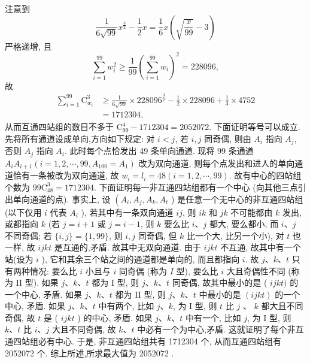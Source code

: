 注意到
$$
\frac{1}{6 \sqrt{99}} x^{\frac{3}{2}}-\frac{1}{2} x=\frac{1}{6} x\left(\sqrt{\frac{x}{99}}-3\right)
$$
严格递增, 且
$$
\sum_{i=1}^{99} w_i^2 \geqslant \frac{1}{99}\left(\sum_{i=1}^{99} w_i\right)^2=228096,
$$
故
$$
\begin{aligned}
\sum_{i=1}^{99} \mathrm{C}_{w_i}^3 & \geqslant \frac{1}{6 \sqrt{99}} \times 228096^{\frac{3}{2}}-\frac{1}{2} \times 228096+\frac{1}{3} \times 4752 \\
& =1712304,
\end{aligned}
$$
从而互通四站组的数目不多于 $\mathrm{C}_{99}^4-1712304=2052072$.
下面证明等号可以成立.
先将所有通道设成单向,方向如下规定: 对 $i< j$, 若 $i, j$ 同奇偶, 则由 $A_i$ 指向 $A_j$, 否则 $A_j$ 指向 $A_i$. 此时每个点恰发出 49 条单向通道.
现将 99 条通道 $A_i A_{i+1}\left(i=1,2, \cdots, 99, A_{100}=A_1\right)$ 改为双向通道, 则每个点发出和进人的单向通道恰有一条被改为双向通道, 故 $w_i=l_i=48(i= 1,2, \cdots, 99)$. 故有中心的四站组个数为 $99 \mathrm{C}_{48}^3=1712304$.
下面证明每一非互通四站组都有一个中心 (向其他三点引出单向通道的点). 事实上, 设 $\left(A_i, A_j, A_k, A_t\right.$ ) 是任意一个无中心的非互通四站组 (以下仅用 $i$ 代表 $A_i$ ), 若其中有一条双向通道 $i j$, 则 $i k$ 和 $j k$ 不可能都由 $k$ 发出, 或都指向 $k$ (若 $j=i+1$ 或 $j=i-1$, 则 $k$ 要么比 $i 、 j$ 都大, 要么都小, 而 $i 、 j$ 不同奇偶; 若 $\{i, j\}=\{1,99\}$, 则 $i, j$ 同奇偶, 但 $k$ 比一个大, 比另一个小), 对 $t$
也一样, 故 $i j k t$ 是互通的,矛盾.
故其中无双向通道.
由于 $i j k t$ 不互通, 故其中有一个站(设为 $i$ ), 它和其余三个站之间的通道都是单向的, 而且都指向 $i$. 故 $j 、 k 、 t$ 只有两种情况: 要么比 $i$ 小且与 $i$ 同奇偶 (称为 $I$ 型), 要么比 $i$ 大且奇偶性不同 (称为 II 型). 如果 $j 、 k 、 t$ 都为 I 型, 则 $j 、 k 、 t$ 同奇偶, 故其中最小的是 ( $i j k t)$ 的一个中心, 矛盾.
如果 $j 、 k 、 t$ 都为 II 型, 则 $j 、 k 、 t$ 中最小的是 $(i j k t)$ 的一个中心, 矛盾.
如果 $j 、 k 、 t$ 中有两个, 比如 $j 、 k$, 为 I 型, 则 $t$ 比 $j$ 、 $k$ 都大且不同奇偶, 故 $t$ 是 ( $i j k t$ ) 的中心, 矛盾.
如果 $j 、 k 、 t$ 中有一个, 比如 $j$, 为 I 型, 则 $k 、 t$ 比 $i 、 j$ 大且不同奇偶, 故 $k 、 t$ 中必有一个为中心,矛盾.
这就证明了每个非互通四站组必有中心.
于是, 非互通四站组共有 1712304 个, 从而互通四站组有 2052072 个.
综上所述,所求最大值为 2052072 .



